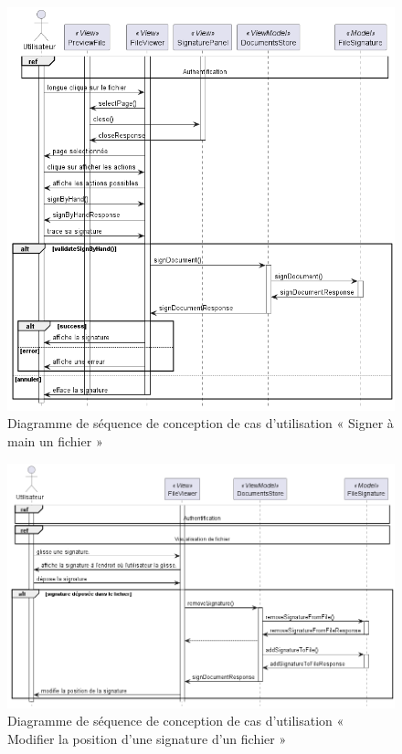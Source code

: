 \begin{figure}[H]
  \centering
  \includegraphics[width=1\textwidth]{out/diagrams/sprint4/sequence_sign_by_hand/sequence_sign_by_hand}
  \caption{Diagramme de séquence de conception de cas d'utilisation « Signer à main un fichier »}
  \label{fig:sequence_conception_sign_by_hand}
\end{figure}

\begin{figure}[H]
  \centering
  \includegraphics[width=1\textwidth]{out/diagrams/sprint4/sequence_move_signature/sequence_move_signature}
  \caption{Diagramme de séquence de conception de cas d'utilisation « Modifier la position d'une signature d'un fichier »}
  \label{fig:sequence_conception_move_signature}
\end{figure}

